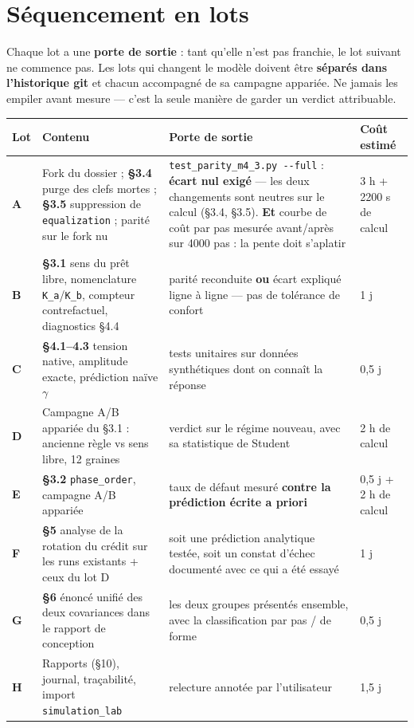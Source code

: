 \documentclass[11pt,a4paper]{article}
\newcommand{\code}[1]{\texttt{#1}}
\begin{document}
\bigskip

\setcounter{section}{7}
\section{Séquencement en lots}

Chaque lot a une \textbf{porte de sortie} : tant qu'elle n'est pas franchie, le lot suivant ne commence pas. Les lots qui changent le modèle doivent être \textbf{séparés dans l'historique git} et chacun accompagné de sa campagne appariée. Ne jamais les empiler avant mesure --- c'est la seule manière de garder un verdict attribuable.

\begin{center}
\begin{tabularx}{\linewidth}{@{}lXXl@{}}
\toprule
\textbf{Lot} & \textbf{Contenu} & \textbf{Porte de sortie} & \textbf{Coût estimé} \\
\midrule
\textbf{A} & Fork du dossier ; \textbf{§3.4} purge des clefs mortes ; \textbf{§3.5} suppression de \code{equalization} ; parité sur le fork nu & \code{test\_parity\_m4\_3.py -{}-full} : \textbf{écart nul exigé} --- les deux changements sont neutres sur le calcul (§3.4, §3.5). \textbf{Et} courbe de coût par pas mesurée avant/après sur 4000 pas : la pente doit s'aplatir & 3 h + 2200 s de calcul \\
\textbf{B} & \textbf{§3.1} sens du prêt libre, nomenclature \code{K\_a}/\code{K\_b}, compteur contrefactuel, diagnostics §4.4 & parité reconduite \textbf{ou} écart expliqué ligne à ligne --- pas de tolérance de confort & 1 j \\
\textbf{C} & \textbf{§4.1--4.3} tension native, amplitude exacte, prédiction naïve \ensuremath{\gamma} & tests unitaires sur données synthétiques dont on connaît la réponse & 0,5 j \\
\textbf{D} & Campagne A/B appariée du §3.1 : ancienne règle vs sens libre, 12 graines & verdict sur le régime nouveau, avec sa statistique de Student & 2 h de calcul \\
\textbf{E} & \textbf{§3.2} \code{phase\_order}, campagne A/B appariée & taux de défaut mesuré \textbf{contre la prédiction écrite a priori} & 0,5 j + 2 h de calcul \\
\textbf{F} & \textbf{§5} analyse de la rotation du crédit sur les runs existants + ceux du lot D & soit une prédiction analytique testée, soit un constat d'échec documenté avec ce qui a été essayé & 1 j \\
\textbf{G} & \textbf{§6} énoncé unifié des deux covariances dans le rapport de conception & les deux groupes présentés ensemble, avec la classification par pas / de forme & 0,5 j \\
\textbf{H} & Rapports (§10), journal, traçabilité, import \code{simulation\_lab} & relecture annotée par l'utilisateur & 1,5 j \\
\bottomrule
\end{tabularx}
\end{center}
\end{document}
